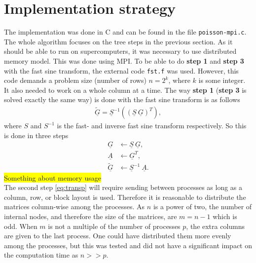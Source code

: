 \section{Implementation strategy}
%
The implementation was done in C and can be found in the file \verb+poisson-mpi.c+. The whole algorithm focuses on the tree steps in the previous section. As it should be able to run on supercomputers, it was necessary to use distributed memory model. This was done using MPI. To be able to do \textbf{step 1} and \textbf{step 3} with the fast sine transform, the external code \verb+fst.f+ was used. However, this code demands a problem size (number of rows) $n = 2^k$, where $k$ is some integer. It also needed to work on a whole column at a time. The way \textbf{step 1} (\textbf{step 3} is solved exactly the same way) is done with the fast sine transform is as follows
%
\begin{align}
\underline{\tilde{G}} = \underline{S}^{-1} \left( (\underline{S} \: \underline{G})^T   \right),
\end{align}
%
where $S$ and $S^{-1}$ is the fast- and inverse fast sine transform respectively. So this is done in three steps
%
\begin{align}
  \underline{G} &\leftarrow \underline{S} \: \underline{G},\\
  \label{eq:transp} 
  \underline{A} &\leftarrow \underline{G}^T,\\
  \underline{\tilde G} &\leftarrow \underline{S}^{-1} \: \underline{A}.
\end{align}
%
\colorbox{yellow}{Something about memory usage}\\
The second step \eqref{eq:transp} will require sending between processes as long as a column, row, or block layout is used. Therefore it is reasonable to distribute the matrices column-wise among the processes. As $n$ is a power of two, the number of internal nodes, and therefore the size of the matrices, are $m = n-1$ which is odd. When $m$ is not a multiple of the number of processes $p$, the extra columns are given to the last process. One could have distributed them more evenly among the processes, but this was tested and did not have a significant impact on the computation time as $n >> p$.

